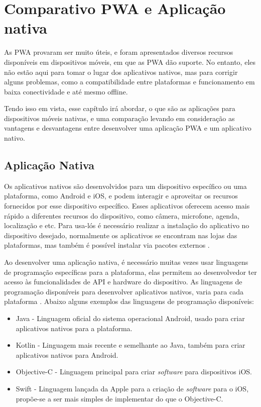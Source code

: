 \chapter{{\Large \textbf{Comparativo PWA e Aplicação nativa}}}

As \ac{PWA} provaram ser muito úteis, e foram apresentados diversos recursos disponíveis em dispositivos móveis, em que as \ac{PWA} dão suporte. No entanto, eles não estão aqui para tomar o lugar dos aplicativos nativos, mas para corrigir alguns problemas, como a compatibilidade entre plataformas e funcionamento em baixa conectividade e até mesmo offline.

Tendo isso em vista, esse capítulo irá abordar, o que são as aplicações para dispositivos móveis nativas, e uma comparação levando em consideração as vantagens e desvantagens entre desenvolver uma aplicação \ac{PWA} e um aplicativo nativo.

\section{Aplicação Nativa}
Os aplicativos nativos são desenvolvidos para um dispositivo específico ou uma plataforma, como Android e iOS, e podem interagir e aproveitar os recursos fornecidos por esse dispositivo específico. Esses aplicativos oferecem acesso mais rápido a diferentes recursos do dispositivo, como câmera, microfone, agenda, localização e etc.
Para usa-lós é necessário realizar a instalação do aplicativo no dispositivo desejado, normalmente os aplicativos se encontram nas lojas das plataformas, mas também é possível instalar via pacotes externos \cite{native}.

Ao desenvolver uma aplicação nativa, é necessário muitas vezes usar linguagens de programação específicas para a plataforma, elas permitem ao desenvolvedor ter acesso às funcionalidades de \ac{API} e hardware do dispositivo. As linguagens de programação disponíveis para desenvolver aplicativos nativos, varia para cada plataforma \cite{native}. Abaixo alguns exemplos das linguagens de programação disponíveis:

\begin{itemize}
	\item Java - Linguagem oficial do sistema operacional Android, usado para criar aplicativos nativos para a plataforma.
	\item Kotlin - Linguagem mais recente e semelhante ao Java, também para criar aplicativos nativos para Android.
	\item Objective-C - Linguagem principal para criar \textit{software} para dispositivos iOS.
	\item Swift -  Linguagem lançada da Apple para a criação de \textit{software} para o iOS, propõe-se a ser mais simples de implementar do que o Objective-C.
\end{itemize}


